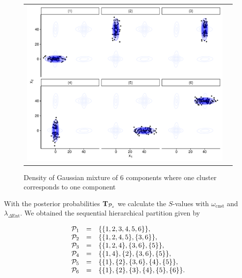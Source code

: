 \documentclass[submit]{smj}
\theoremstyle{definition}
\begin{document}
\begin{figure}[h]
\begin{center}
\begin{tabular}{cc}
  \includegraphics[width=\textwidth]{figures/partition-example-part6.pdf} \\
 \end{tabular}
 \caption{Density of Gaussian mixture of 6 components where one cluster corresponds to one component}\label{ex_one_one}
\end{center}
\end{figure}

With the posterior probabilities $\text{\textbf{T}}_{\mathcal{P}_s}$ we calculate the $S$-values with $\omega_{\text{cnst}}$ and $\lambda_{\Delta\text{Ent}}$. We obtained the sequential hierarchical partition given by 

\begin{equation}
\begin{array}{r c l}
\mathcal{P}_1 &=& \{\{1, 2, 3, 4, 5, 6\}\}, \\
\mathcal{P}_2 &=& \{\{1, 2 , 4, 5\}, \{3, 6\} \},  \\
\mathcal{P}_3 &=& \{\{1, 2, 4\}, \{3, 6\}, \{5\} \}, \\
\mathcal{P}_4 &=& \{\{1, 4\},\{2\}, \{3, 6\}, \{5\} \}, \\
\mathcal{P}_5 &=& \{\{1\},\{2\}, \{3, 6\},\{4\},\{5\} \},\\
\mathcal{P}_6 &=& \{\{1\},\{2\},\{3\},\{4\},\{5\},\{6\}\}.
\end{array}
\label{hier_ex}
\end{equation}
\end{document}
